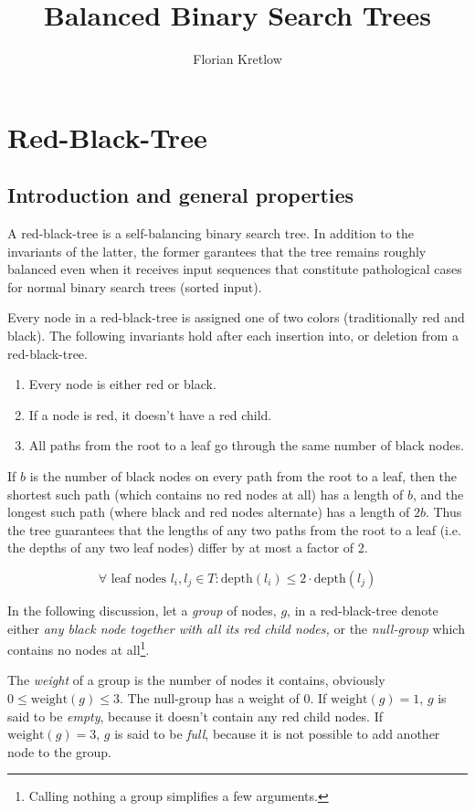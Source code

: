 \documentclass{article}
\title{Balanced Binary Search Trees}
\author{Florian Kretlow}
\begin{document}
\section{Red-Black-Tree}

\subsection{Introduction and general properties}
A red-black-tree is a self-balancing binary search tree. In addition to the invariants
of the latter, the former garantees that the tree remains roughly balanced even when it
receives input sequences that constitute pathological cases for normal binary search
trees (sorted input).

Every node in a red-black-tree is assigned one of two colors (traditionally red and
black). The following invariants hold after each insertion into, or deletion from a
red-black-tree.

\begin{enumerate}[label=(\arabic*)]
\item Every node is either red or black.
\item If a node is red, it doesn't have a red child.
\item All paths from the root to a leaf go through the same number of black nodes.
\end{enumerate}

If \(b\) is the number of black nodes on every path from the root to a leaf, then
the shortest such path (which contains no red nodes at all) has a length of \(b\), and
the longest such path (where black and red nodes alternate) has a length of
\(2b\). Thus the tree guarantees that the lengths of any two
paths from the root to a leaf (i.e. the depths of any two leaf nodes) differ by at most
a factor of 2.

\[
\forall \text{ leaf nodes } l_{i}, l_{j} \in T : \text{depth}(l_i) \leq 2 \cdot
\text{depth}(l_j)
\]

In the following discussion, let a \emph{group} of nodes, \(g\), in a red-black-tree
denote either \emph{any black node together with all its red child nodes,} or the
\emph{null-group} which contains no nodes at all\footnote{Calling nothing a group
simplifies a few arguments.}.

The \emph{weight} of a group is the number of nodes it contains, obviously \(0 \leq
\text{weight}(g) \leq 3\). The null-group has a weight of 0. If \(\text{weight}(g) =
1\), \(g\) is said to be \emph{empty}, because it doesn't contain any red child nodes.
If \(\text{weight}(g) = 3\), \(g\) is said to be \emph{full}, because it is not possible
to add another node to the group.
\end{document}
